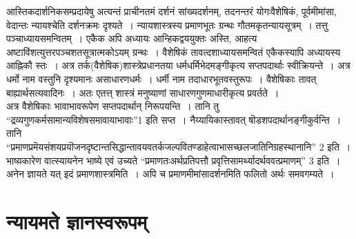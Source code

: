 {आस्तिकदार्शनिकसम्प्रदायेषु अत्यन्तं प्राचीनतमं दर्शनं सांख्यदर्शनम्, तदनन्तरं योगः\break वैशेषिकं, पूर्वमीमांसा, वेदान्तः न्यायश्चेति दर्शनक्रमः दृश्यते~। न्यायशास्त्रस्य प्रमाणभूतः \hbox{ग्रन्थः} गौतमकृतन्यायसूत्रम्~। तत्तु पञ्चाध्यायसमन्वितम्~। एकैक अपि अध्यायः आन्हिकद्वययुक्तः अस्ति, आहत्य अष्टाविंशत्युत्तरपञ्चशतसूत्रात्मकोऽयम् ग्रन्थः~। वैशेषिकं \hbox{तावत्}\break दशाध्यायसमन्वितं एकैकस्यापि अध्यायस्य आह्निकौ स्तः~। अत्र तर्क(वैशेषिक)शास्त्रे\break प्रधानतया धर्मधर्मिभेदमङ्गीकृत्य सप्तपदार्थाः स्वीक्रियन्ते~। अत्र धर्मो नाम वस्तुनि दृश्यमानः असाधारणधर्मः~। धर्मी नाम तदाधारभूतवस्तुरूपः~। वैशेषिकाः तावत् बाह्यार्थसत्यवादिनः~। अतः एतत्त् शास्त्रं मनुष्याणां साधारणगुणमाधारीकृत्य प्रवर्तते~। 
~\\[0.2cm]
अत्र वैशेषिकाः भावाभावरूपेण सप्तपदार्थान् निरूपयन्ति~। तानि तु “द्रव्यगुणकर्मसामान्य\break विशेषसमावायाभावाः”1 इति सप्त~। नैय्यायिकास्तावत् षॊडशपदार्थानङ्गीकुर्वन्ति~। \hbox{तानि \enginline{-}}\\
“प्रमाण\enginline{-}प्रमॆय\enginline{-}संशय\enginline{-}प्रयॊजन\enginline{-}दृष्टान्त\enginline{-}सिद्धान्तावयवतर्क\enginline{-}जल्पवितण्डा\enginline{-}हेत्वाभास\enginline{-}च्छल\enginline{-}\break जाति\enginline{-}निग्रहस्थानानि” 2 इति~। भाष्य़कारेण वात्स्यायनेन भाष्ये एवं उच्यते \hbox{“प्रमाणतः}\break अर्थप्रतिपत्तौ प्रवृत्तिसामर्थ्यादर्थववत्प्रमाणम्” 3 इति~। अनेन ज्ञायते यत् इदं प्रमाणशास्त्रमिति~। अपि च प्रमाणमीमांसादर्शनमिति फलितो अर्थः समवगम्यते~। 

\section*{न्यायमते ज्ञानस्वरूपम् }

}
